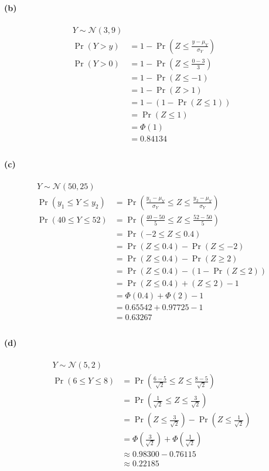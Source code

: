 \documentclass[10pt,letter]{article}
\begin{document}
\paragraph{(b)}
\begin{align*}
Y\sim \mathcal{N}(3,9)\\
\Pr(Y> y) &= 1 -\Pr\left(Z\leq \frac{y-\mu_Y}{\sigma_{Y}} \right)\\
\Pr(Y > 0) &= 1- \Pr\left(Z\leq \frac{0-3}{3} \right)\\
&= 1- \Pr\left(Z\leq -1 \right)\\
&= 1- \Pr\left(Z > 1 \right)\\
&= 1- \left(1 - \Pr\left(Z\leq 1 \right) \right)\\
&=\Pr\left(Z\leq 1 \right)\\
&=\Phi(1)\\
&= 0.84134\\
\end{align*}

\paragraph{(c)}
\begin{align*}
Y\sim \mathcal{N}(50,25)\\
\Pr(y_1\leq Y\leq y_2) &= \Pr\left(\frac{y_1-\mu_Y}{\sigma_{Y}} \leq Z\leq \frac{y_2-\mu_Y}{\sigma_{Y}} \right)\\
\Pr(40\leq Y\leq 52) &= \Pr\left(\frac{40-50}{5} \leq Z\leq \frac{52-50}{5} \right)\\
&= \Pr\left(-2 \leq Z\leq 0.4 \right)\\
&=\Pr\left(Z\leq 0.4 \right)-\Pr\left(Z\leq -2 \right)\\
&=\Pr\left(Z\leq 0.4 \right)-\Pr\left(Z\geq 2 \right)\\
&=\Pr\left(Z\leq 0.4 \right)-\left(1-\Pr\left(Z\leq 2 \right)\right)\\
&=\Pr\left(Z\leq 0.4 \right)+\left(Z\leq 2 \right) -1\\
&=\Phi(0.4)+\Phi(2)-1\\
&= 0.65542+ 0.97725 -1\\
&=0.63267\\
\end{align*}

\paragraph{(d)}
\begin{align*}
Y\sim \mathcal{N}(5,2)\\
\Pr(6\leq Y\leq 8) &= \Pr\left(\frac{6-5}{\sqrt{2}} \leq Z\leq \frac{8-5}{\sqrt{2}} \right)\\
&= \Pr\left(\frac{1}{\sqrt{2}} \leq Z\leq \frac{3}{\sqrt{2}} \right)\\
&=\Pr\left(Z\leq \frac{3}{\sqrt{2}} \right)-\Pr\left(Z\leq \frac{1}{\sqrt{2}} \right)\\
&=\Phi \left(\frac{3}{\sqrt{2}}\right)+\Phi\left(\frac{1}{\sqrt{2}}\right)\\
&\approx 0.98300 - 0.76115\\
&\approx 0.22185\\
\end{align*}
\end{document}
